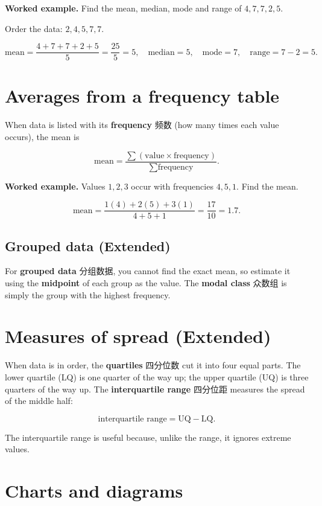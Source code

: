 \documentclass[11pt]{article}
\begin{document}
\textbf{Worked example.} Find the mean, median, mode and range of $4, 7, 7, 2, 5$.

Order the data: $2, 4, 5, 7, 7$.

\[
\text{mean} = \frac{4 + 7 + 7 + 2 + 5}{5} = \frac{25}{5} = 5, \quad \text{median} = 5, \quad \text{mode} = 7, \quad \text{range} = 7 - 2 = 5.
\]

\section*{Averages from a frequency table}

When data is listed with its \textbf{frequency} 频数 (how many times each value occurs), the mean is

\[
\text{mean} = \frac{\sum (\text{value} \times \text{frequency})}{\sum \text{frequency}}.
\]

\textbf{Worked example.} Values $1, 2, 3$ occur with frequencies $4, 5, 1$. Find the mean.

\[
\text{mean} = \frac{1(4) + 2(5) + 3(1)}{4 + 5 + 1} = \frac{17}{10} = 1.7.
\]

\subsection*{Grouped data (Extended)}

For \textbf{grouped data} 分组数据, you cannot find the exact mean, so estimate it using the \textbf{midpoint} of each group as the value. The \textbf{modal class} 众数组 is simply the group with the highest frequency.

\section*{Measures of spread (Extended)}

When data is in order, the \textbf{quartiles} 四分位数 cut it into four equal parts. The lower quartile (LQ) is one quarter of the way up; the upper quartile (UQ) is three quarters of the way up. The \textbf{interquartile range} 四分位距 measures the spread of the middle half:

\[
\text{interquartile range} = \text{UQ} - \text{LQ}.
\]

The interquartile range is useful because, unlike the range, it ignores extreme values.

\section*{Charts and diagrams}
\end{document}
